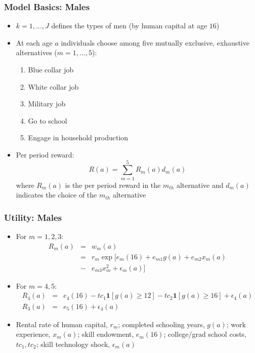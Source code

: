 \begin{frame}
	\frametitle{Model Basics: Males}
	\begin{itemize}
		\item $k = 1, \ldots, J$ defines the types of men (by human capital at age $16$)
		\item At each age $a$ individuals choose among five mutually exclusive, exhaustive alternatives ($m = 1, \ldots, 5$):
		\begin{enumerate}
			\item Blue collar job
			\item White collar job
			\item Military job
			\item Go to school
			\item Engage in household production
		\end{enumerate}
		\item Per period reward:
		\begin{equation}
			R(a) = \sum \limits _{m=1} ^ 5 R_{m}(a)d_{m}(a) \nonumber
		\end{equation}
		\noindent where $R_{m}(a)$ is the per period reward in the $m_{th}$ alternative and $d_{m}(a)$ indicates the choice of the $m_{th}$ alternative 
	\end{itemize}
\end{frame}

\begin{frame}
	\frametitle{Utility: Males}
	\begin{itemize}
		\item For $m = 1, 2, 3$:
		\begin{eqnarray}
			R_{m}(a) &=& w_{m}(a) \nonumber \\
			         &=& r_{m} \exp [ e_{m}(16) + e_{m1}g(a) + e_{m2}x_{m}(a) \nonumber \\ 
			         &-& e_{m3}x_{m}^2 + \epsilon_{m}(a) ] \nonumber
		\end{eqnarray}
		\item For $m = 4, 5$:
		\begin{eqnarray}
			R_{4}(a) &=& e_{4}(16) - tc_{1} \mathbf{1} [g(a) \geq 12] - tc_{2} \mathbf{1} [g(a) \geq 16] + \epsilon_{4}(a) \nonumber \\
			R_{3}(a) &=& e_{5}(16) + \epsilon_{4}(a) \nonumber
		\end{eqnarray}
		\item Rental rate of human capital, $r_{m}$; completed schooling years, $g(a)$; work experience, $x_{m}(a)$; skill endowment, $e_{m}(16)$; college/grad school costs, $tc_{1},tc_{2}$; skill technology shock, $\epsilon_{m}(a)$
	\end{itemize}
\end{frame}

